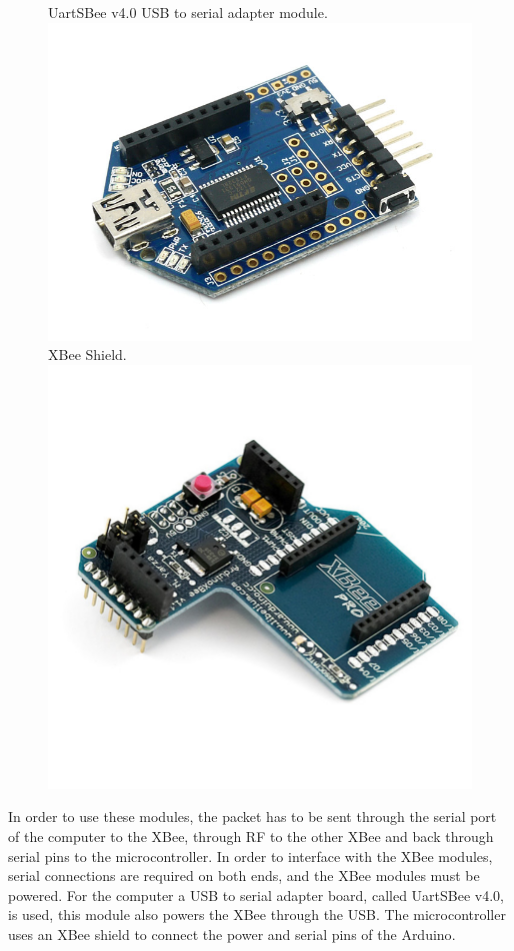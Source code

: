 \begin{figure}[H]
  \centering
  \captionbox
  {
    UartSBee v4.0 USB to serial adapter module.\cite{UartSBee}
    \label{fig:UartSBee}
  }
  {
    \includegraphics[width=.37\textwidth]{figures/UartSBee}
  }
  \hspace{5pt}
  \captionbox
  {
    XBee Shield.\cite{XBeeShield}
    \label{fig:XbeeShield}
  }
  {
    \includegraphics[width=.37\textwidth]{figures/XbeeShield}
    \vspace{.5cm}
  }
\end{figure}
%
In order to use these modules, the packet has to be sent through the serial port of the computer to the XBee, through RF to the other XBee and back through serial pins to the microcontroller. In order to interface with the XBee modules, serial connections are required on both ends, and the XBee modules must be powered. For the computer a USB to serial adapter board, called UartSBee v4.0, is used, this module also powers the XBee through the USB\cite{UartSBeeSch}. The microcontroller uses an XBee shield to connect the power and serial pins of the Arduino\cite{XbeeShieldSch}.